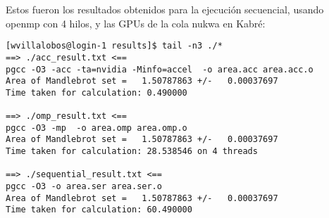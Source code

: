 Estos fueron los resultados obtenidos para la ejecución secuencial, usando openmp con 4 hilos, y las GPUs de la cola nukwa en Kabré:

\begin{lstlisting}
[wvillalobos@login-1 results]$ tail -n3 ./*
==> ./acc_result.txt <==
pgcc -O3 -acc -ta=nvidia -Minfo=accel  -o area.acc area.acc.o 
Area of Mandlebrot set =   1.50787863 +/-   0.00037697
Time taken for calculation: 0.490000

==> ./omp_result.txt <==
pgcc -O3 -mp  -o area.omp area.omp.o 
Area of Mandlebrot set =   1.50787863 +/-   0.00037697
Time taken for calculation: 28.538546 on 4 threads

==> ./sequential_result.txt <==
pgcc -O3 -o area.ser area.ser.o 
Area of Mandlebrot set =   1.50787863 +/-   0.00037697
Time taken for calculation: 60.490000
\end{lstlisting}

\clearpage